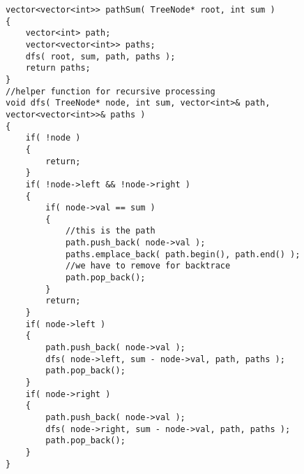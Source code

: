 \setcounter{lstlisting}{0}
\begin{lstlisting}[style=customc, caption={Backtrace}]
vector<vector<int>> pathSum( TreeNode* root, int sum )
{
    vector<int> path;
    vector<vector<int>> paths;
    dfs( root, sum, path, paths );
    return paths;
}
//helper function for recursive processing
void dfs( TreeNode* node, int sum, vector<int>& path, vector<vector<int>>& paths )
{
    if( !node )
    {
        return;
    }
    if( !node->left && !node->right )
    {
        if( node->val == sum )
        {
            //this is the path
            path.push_back( node->val );
            paths.emplace_back( path.begin(), path.end() );
            //we have to remove for backtrace
            path.pop_back();
        }
        return;
    }
    if( node->left )
    {
        path.push_back( node->val );
        dfs( node->left, sum - node->val, path, paths );
        path.pop_back();
    }
    if( node->right )
    {
        path.push_back( node->val );
        dfs( node->right, sum - node->val, path, paths );
        path.pop_back();
    }
}
\end{lstlisting}